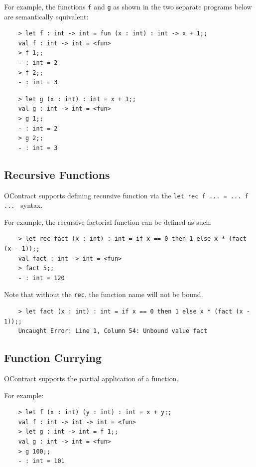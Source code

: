 \documentclass[a4paper]{article}
\begin{document}
For example, the functions \texttt{f} and \texttt{g} as shown in the two separate programs below are semantically equivalent:

\begin{verbatim}
    > let f : int -> int = fun (x : int) : int -> x + 1;;
    val f : int -> int = <fun>
    > f 1;;
    - : int = 2
    > f 2;;
    - : int = 3
\end{verbatim}

\begin{verbatim}
    > let g (x : int) : int = x + 1;;
    val g : int -> int = <fun>
    > g 1;;
    - : int = 2
    > g 2;;
    - : int = 3
\end{verbatim}

\subsection{Recursive Functions}

OContract supports defining recursive function via the \texttt{let rec f ... = ... f ... } syntax.

For example, the recursive factorial function can be defined as such:

\begin{verbatim}
    > let rec fact (x : int) : int = if x == 0 then 1 else x * (fact (x - 1));;
    val fact : int -> int = <fun>
    > fact 5;;
    - : int = 120
\end{verbatim}

Note that without the \texttt{rec}, the function name will not be bound.

\begin{verbatim}
    > let fact (x : int) : int = if x == 0 then 1 else x * (fact (x - 1));;
    Uncaught Error: Line 1, Column 54: Unbound value fact
\end{verbatim}

\subsection{Function Currying}

OContract supports the partial application of a function.

For example:

\begin{verbatim}
    > let f (x : int) (y : int) : int = x + y;;
    val f : int -> int -> int = <fun>
    > let g : int -> int = f 1;;
    val g : int -> int = <fun>
    > g 100;;
    - : int = 101
\end{verbatim}
\end{document}
